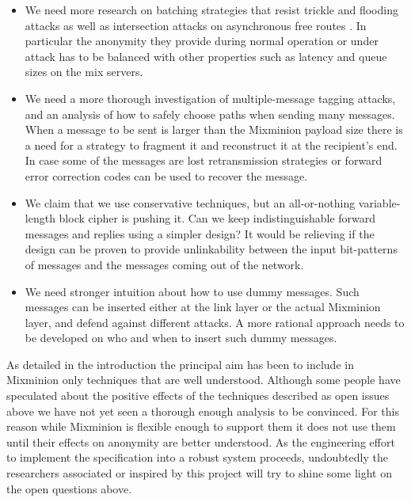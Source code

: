 \documentclass[11pt]{IEEEtran}
\begin{document}
\begin{itemize}
\item We need more research on batching strategies that resist trickle
and flooding attacks \cite{batching-taxonomy} as well as intersection
attacks on asynchronous free routes \cite{disad-free-routes}. In
particular the anonymity they provide during normal operation or under
attack has to be balanced with other properties such as latency and
queue sizes on the mix servers.
\item We need a more thorough investigation of multiple-message tagging
attacks, and an analysis of how to safely choose paths when
sending many messages. When a message to be sent is larger than the
Mixminion payload size there is a need for a strategy to fragment
it and reconstruct it at the recipient's end. In case some of the
messages are lost retransmission strategies or forward error
correction codes can be used to recover the message. 
\item We claim that we use conservative techniques, but an all-or-nothing
variable-length block cipher is pushing it. Can we keep indistinguishable
forward messages and replies using a simpler design? It would be
relieving if the design can be proven to provide unlinkability between
the input bit-patterns of messages and the messages coming out of the
network. 
\item We need stronger intuition about how to use
dummy messages. Such messages can be inserted either at the link layer
or the actual Mixminion layer, and defend against different attacks. A
more rational approach needs to be developed on who and when to insert
such dummy messages.
\end{itemize}

As detailed in the introduction the principal aim has 
been to include in Mixminion only techniques that are well
understood. Although some people have speculated about the positive
effects of the techniques described as open issues above we have not
yet seen a thorough enough analysis to be convinced. For this reason
while Mixminion is flexible enough to support them it does not use
them until their effects on anonymity are better understood. As the
engineering effort to implement the specification into a robust system
proceeds, undoubtedly the researchers associated or inspired by this
project will try to shine some light on the open questions above.
\end{document}
